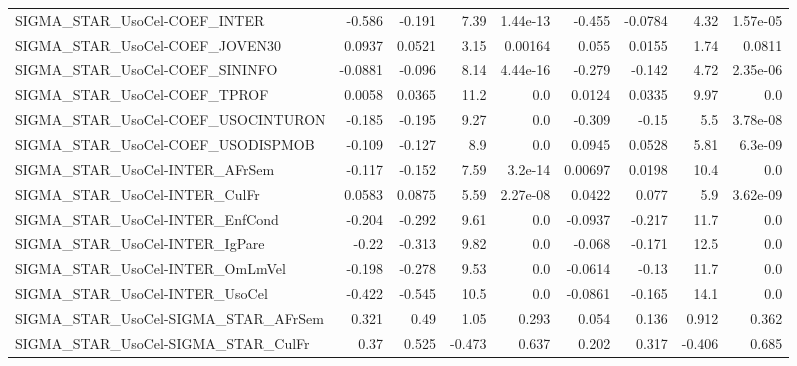 \begin{tabular}{lrrrrrrrr}
SIGMA\_STAR\_UsoCel-COEF\_INTER          &      -0.586 &       -0.191 &    7.39 & 1.44e-13 &     -0.455 &     -0.0784 &         4.32 &      1.57e-05 \\
SIGMA\_STAR\_UsoCel-COEF\_JOVEN30        &      0.0937 &       0.0521 &    3.15 &  0.00164 &      0.055 &      0.0155 &         1.74 &        0.0811 \\
SIGMA\_STAR\_UsoCel-COEF\_SININFO        &     -0.0881 &       -0.096 &    8.14 & 4.44e-16 &     -0.279 &      -0.142 &         4.72 &      2.35e-06 \\
SIGMA\_STAR\_UsoCel-COEF\_TPROF          &      0.0058 &       0.0365 &    11.2 &      0.0 &     0.0124 &      0.0335 &         9.97 &           0.0 \\
SIGMA\_STAR\_UsoCel-COEF\_USOCINTURON    &      -0.185 &       -0.195 &    9.27 &      0.0 &     -0.309 &       -0.15 &          5.5 &      3.78e-08 \\
SIGMA\_STAR\_UsoCel-COEF\_USODISPMOB     &      -0.109 &       -0.127 &     8.9 &      0.0 &     0.0945 &      0.0528 &         5.81 &       6.3e-09 \\
SIGMA\_STAR\_UsoCel-INTER\_AFrSem        &      -0.117 &       -0.152 &    7.59 &  3.2e-14 &    0.00697 &      0.0198 &         10.4 &           0.0 \\
SIGMA\_STAR\_UsoCel-INTER\_CulFr         &      0.0583 &       0.0875 &    5.59 & 2.27e-08 &     0.0422 &       0.077 &          5.9 &      3.62e-09 \\
SIGMA\_STAR\_UsoCel-INTER\_EnfCond       &      -0.204 &       -0.292 &    9.61 &      0.0 &    -0.0937 &      -0.217 &         11.7 &           0.0 \\
SIGMA\_STAR\_UsoCel-INTER\_IgPare        &       -0.22 &       -0.313 &    9.82 &      0.0 &     -0.068 &      -0.171 &         12.5 &           0.0 \\
SIGMA\_STAR\_UsoCel-INTER\_OmLmVel       &      -0.198 &       -0.278 &    9.53 &      0.0 &    -0.0614 &       -0.13 &         11.7 &           0.0 \\
SIGMA\_STAR\_UsoCel-INTER\_UsoCel        &      -0.422 &       -0.545 &    10.5 &      0.0 &    -0.0861 &      -0.165 &         14.1 &           0.0 \\
SIGMA\_STAR\_UsoCel-SIGMA\_STAR\_AFrSem   &       0.321 &         0.49 &    1.05 &    0.293 &      0.054 &       0.136 &        0.912 &         0.362 \\
SIGMA\_STAR\_UsoCel-SIGMA\_STAR\_CulFr    &        0.37 &        0.525 &  -0.473 &    0.637 &      0.202 &       0.317 &       -0.406 &         0.685 \\

\end{tabular}
